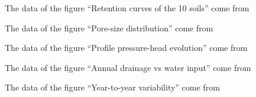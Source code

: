 \begin{exlist}
\item The data of the figure ``Retention curves of the 10 soils'' come from
\item The data of the figure ``Pore-size distribution'' come from
\item The data of the figure ``Profile pressure-head evolution'' come from
\item The data of the figure ``Annual drainage vs water input'' come from
\item The data of the figure ``Year-to-year variability'' come from
\end{exlist}
